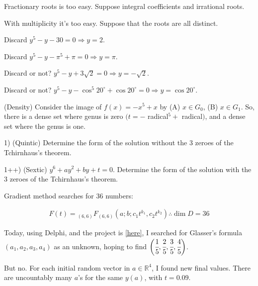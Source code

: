 \documentclass[12pt]{article}
\begin{document}
Fractionary roots is too easy. Suppose integral coefficients and irrational roots.

With multiplicity it's too easy. Suppose that the roots are all distinct.

\vspace{3mm}

Discard $y^5 - y - 30 = 0 \Rightarrow y = 2$.

Discard $y^5 - y - \pi^5 + \pi = 0 \Rightarrow y = \pi$.

Discard or not? $y^5 - y + 3\sqrt{2} = 0 \Rightarrow y = -\sqrt{2}$.

Discard or not? $y^5 - y - \cos^5 20^\circ + \cos 20^\circ = 0 \Rightarrow y = \cos 20^\circ$.

\vspace{3mm}

(Density) Consider the image of $f(x) = - x^5 + x$ by (A) $x \in G_0$, (B) $x \in G_1$. So, there is a dense set where genus is zero $(t = -$ radical$^5 +$ radical$)$, and a dense set where the genus is one.

\vspace{3mm}

1) (Quintic) Determine the form of the solution without the 3 zeroes of the Tchirnhaus's theorem.

\vspace{3mm}

1++) (Sextic) $y^6 + ay^2 + by + t = 0$. Determine the form of the solution with the 3 zeroes of the Tchirnhaus's theorem.

\vspace{3mm}

Gradient method searches for 36 numbers:

\begin{align}
F(t) = {}_{(6,6)}F_{(6,6)} (a; b; c_1 t^{k_1}, c_2 t^{k_2}) \therefore \dim D = 36
\end{align}

\vspace{3mm}

Today, using Delphi, and the project is \href{https://drive.google.com/file/d/1z0QdJhS-eVbJG3I8OK82LsEDsDLimAiU/view?usp=sharing}{\color{blue}\underline{[here]}}, I searched for Glasser's formula $(a_1, a_2, a_3, a_4)$ as an unknown, hoping to find $\bigg(\cfrac{1}{5}, \cfrac{2}{5}, \cfrac{3}{5}, \cfrac{4}{5}\bigg)$.

But no. For each initial random vector in $a \in \mathbb{R}^4$, I found new final values. There are uncountably many $a$'s for the same $y(a)$, with $t = 0.09$.
\end{document}
